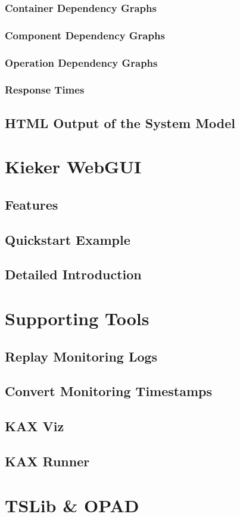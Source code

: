 			\subsubsection{Container Dependency Graphs}
			\subsubsection{Component Dependency Graphs}
			\subsubsection{Operation Dependency Graphs}
			\subsubsection{Response Times}
		\subsection{HTML Output of the System Model}	
			
	\section{Kieker WebGUI}\label{chp:Kieker-WebGUI}
		\subsection{Features}
		\subsection{Quickstart Example}
		\subsection{Detailed Introduction}		
			
	\section{Supporting Tools}
		\subsection{Replay Monitoring Logs}
		\subsection{Convert Monitoring Timestamps}
		\subsection{KAX Viz}
		\subsection{KAX Runner}
		
	\section{TSLib \& OPAD}
	